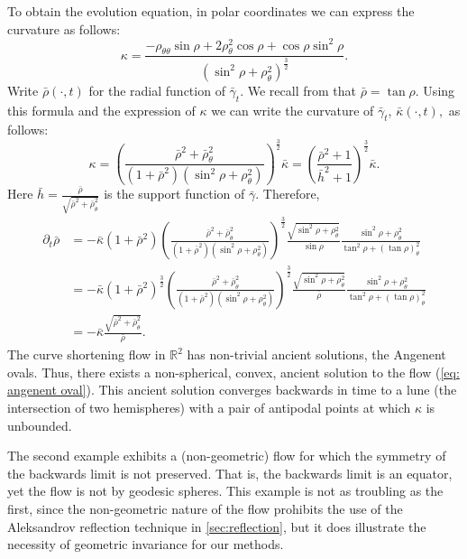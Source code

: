 \documentclass{amsart}
\begin{document}
\begin{example}
To obtain the evolution equation, in polar coordinates we can express the curvature as follows:
\[\kappa=\frac{-\rho_{\theta\theta}\sin\rho+2\rho_\theta^2\cos\rho+\cos\rho\sin^2\rho}{(\sin^2\rho+\rho_{\theta}^2)^{\frac{3}{2}}}.\]
Write $\bar{\rho}(\cdot,t)$ for the radial function of $\bar{\gamma}_t$. We recall from \cite[p.~8]{BesauWerner:11/2014} that
$\bar{\rho}=\tan\rho.$ Using this formula and the expression of $\kappa$ we can write the curvature of $\bar{\gamma}_t$,  $\bar{\kappa}(\cdot,t),$ as follows:
\[\kappa=\left(\frac{\bar{\rho}^2+\bar{\rho}_{\theta}^2}{(1+\bar{\rho}^2)(\sin^2\rho+\rho_{\theta}^2)}\right)^{\frac{3}{2}}\bar{\kappa}=\left(\frac{\bar{\rho}^2+1}{\bar{h}^2+1}\right)^{\frac{3}{2}}\bar{\kappa}.\]
Here $\bar{h}=\frac{\bar{\rho}}{\sqrt{\bar{\rho}^2+\bar{\rho}_{\theta}^2}}$ is the support function of $\bar{\gamma}.$
Therefore,
\begin{align*}
\partial_t\bar{\rho}&=-\bar{\kappa}(1+\bar{\rho}^2)\left(\frac{\bar{\rho}^2+\bar{\rho}_{\theta}^2}{(1+\bar{\rho}^2)(\sin^2\rho+\rho_{\theta}^2)}\right)^{\frac{3}{2}}\frac{\sqrt{\sin^2\rho+\rho_{\theta}^2}}{\sin\rho}\frac{\sin^2\rho+\rho_{\theta}^2}{\tan^2\rho+(\tan\rho)_{\theta}^2}\\
&=-\bar{\kappa}(1+\bar{\rho}^2)^{\frac{3}{2}}\left(\frac{\bar{\rho}^2+\bar{\rho}_{\theta}^2}{(1+\bar{\rho}^2)(\sin^2\rho+\rho_{\theta}^2)}\right)^{\frac{3}{2}}\frac{\sqrt{\sin^2\rho+\rho_{\theta}^2}}{\bar{\rho}}\frac{\sin^2\rho+\rho_{\theta}^2}{\tan^2\rho+(\tan\rho)_{\theta}^2}\\
&=-\bar{\kappa}\frac{\sqrt{\bar{\rho}^2+\bar{\rho}_{\theta}^2}}{\bar{\rho}}.
\end{align*}
The curve shortening flow in $\mathbb{R}^2$ has non-trivial ancient solutions, the Angenent ovals. Thus, there exists a non-spherical, convex, ancient solution to the flow (\ref{eq: angenent oval}). This ancient solution converges backwards in time to a lune (the intersection of two hemispheres) with a pair of antipodal points at which \(\kappa\) is unbounded.
\end{example}

The second example exhibits a (non-geometric) flow for which the symmetry of the backwards limit is not preserved. That is, the backwards limit is an equator, yet the flow is not by geodesic spheres. This example is not as troubling as the first, since the non-geometric nature of the flow prohibits the use of the Aleksandrov reflection technique in \cref{sec:reflection}, but it does illustrate the necessity of geometric invariance for our methods.
\end{document}
